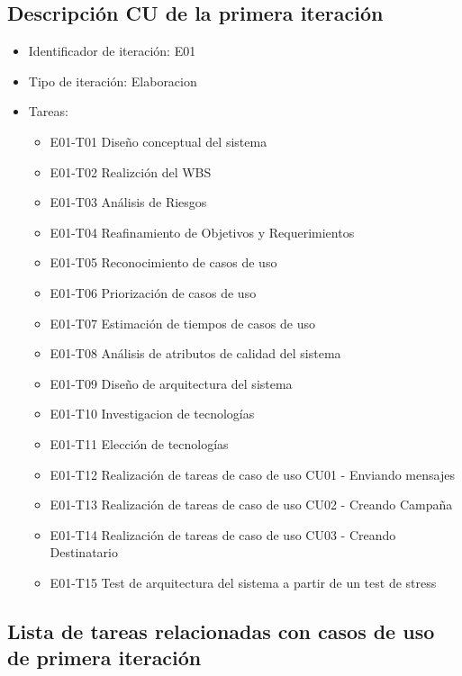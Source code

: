 \documentclass[a4paper, 11pt]{article}
\begin{document}
\subsection{Descripción CU de la primera iteración}
\begin{itemize}
\item Identificador de iteraci\'on: E01
\item Tipo de iteraci\'on: Elaboracion
\item Tareas:
\begin{itemize}
\item{E01-T01} Diseño conceptual del sistema
\item{E01-T02} Realizción del WBS
\item{E01-T03} Análisis de Riesgos
\item{E01-T04} Reafinamiento de Objetivos y Requerimientos
\item{E01-T05} Reconocimiento de casos de uso
\item{E01-T06} Priorizaci\'on de casos de uso 
\item{E01-T07} Estimación de tiempos de casos de uso
\item{E01-T08} Análisis de atributos de calidad del sistema
\item{E01-T09} Diseño de arquitectura del sistema
\item{E01-T10} Investigacion de tecnolog\'ias
\item{E01-T11} Elección de tecnologías
\item{E01-T12} Realización de tareas de caso de uso CU01 - Enviando mensajes
\item{E01-T13} Realización de tareas de caso de uso CU02 - Creando Campa\~na
\item{E01-T14} Realización de tareas de caso de uso CU03 - Creando Destinatario
\item{E01-T15} Test de arquitectura del sistema a partir de un test de stress
\end{itemize}
\end{itemize}

\subsection{Lista de tareas relacionadas con casos de uso de primera iteraci\'on}
\end{document}
